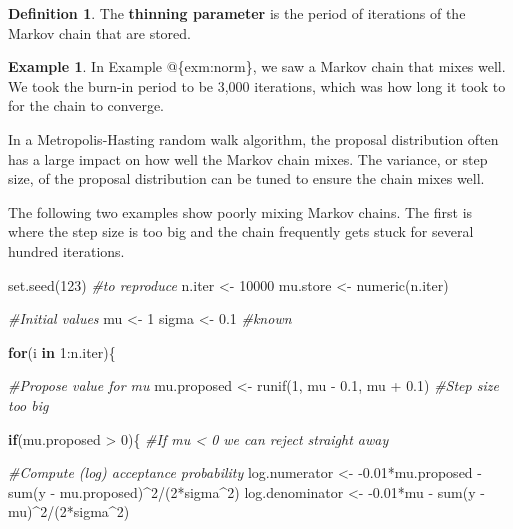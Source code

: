 \documentclass[
]{book}
\newenvironment{Shaded}{\begin{snugshade}}{\end{snugshade}}
\newcommand{\CommentTok}[1]{\textcolor[rgb]{0.56,0.35,0.01}{\textit{#1}}}
\newcommand{\ControlFlowTok}[1]{\textcolor[rgb]{0.13,0.29,0.53}{\textbf{#1}}}
\newcommand{\DecValTok}[1]{\textcolor[rgb]{0.00,0.00,0.81}{#1}}
\newcommand{\FloatTok}[1]{\textcolor[rgb]{0.00,0.00,0.81}{#1}}
\newcommand{\FunctionTok}[1]{\textcolor[rgb]{0.00,0.00,0.00}{#1}}
\newcommand{\NormalTok}[1]{#1}
\newcommand{\OtherTok}[1]{\textcolor[rgb]{0.56,0.35,0.01}{#1}}
\newcommand{\SpecialCharTok}[1]{\textcolor[rgb]{0.00,0.00,0.00}{#1}}
\theoremstyle{definition}
\newtheorem{definition}{Definition}[chapter]
\theoremstyle{definition}
\newtheorem{example}{Example}[chapter]
\theoremstyle{definition}
\theoremstyle{definition}
\theoremstyle{remark}
\begin{document}
\begin{definition}
The \textbf{thinning parameter} is the period of iterations of the Markov chain that are stored.
\end{definition}

\begin{example}
In Example @\{exm:norm\}, we saw a Markov chain that mixes well. We took the burn-in period to be 3,000 iterations, which was how long it took to for the chain to converge.

In a Metropolis-Hasting random walk algorithm, the proposal distribution often has a large impact on how well the Markov chain mixes. The variance, or step size, of the proposal distribution can be tuned to ensure the chain mixes well.

The following two examples show poorly mixing Markov chains. The first is where the step size is too big and the chain frequently gets stuck for several hundred iterations.

\begin{Shaded}
\begin{Highlighting}[]
\FunctionTok{set.seed}\NormalTok{(}\DecValTok{123}\NormalTok{) }\CommentTok{\#to reproduce}
\NormalTok{n.iter   }\OtherTok{\textless{}{-}} \DecValTok{10000}
\NormalTok{mu.store }\OtherTok{\textless{}{-}} \FunctionTok{numeric}\NormalTok{(n.iter)}

\CommentTok{\#Initial values}
\NormalTok{mu }\OtherTok{\textless{}{-}} \DecValTok{1} 
\NormalTok{sigma }\OtherTok{\textless{}{-}} \FloatTok{0.1} \CommentTok{\#known}

\ControlFlowTok{for}\NormalTok{(i }\ControlFlowTok{in} \DecValTok{1}\SpecialCharTok{:}\NormalTok{n.iter)\{}
  
  \CommentTok{\#Propose value for mu}
\NormalTok{  mu.proposed }\OtherTok{\textless{}{-}} \FunctionTok{runif}\NormalTok{(}\DecValTok{1}\NormalTok{, mu }\SpecialCharTok{{-}} \FloatTok{0.1}\NormalTok{, mu }\SpecialCharTok{+} \FloatTok{0.1}\NormalTok{) }\CommentTok{\#Step size too big}
  
  \ControlFlowTok{if}\NormalTok{(mu.proposed }\SpecialCharTok{\textgreater{}} \DecValTok{0}\NormalTok{)\{ }\CommentTok{\#If mu \textless{} 0 we can reject straight away}
    
    \CommentTok{\#Compute (log) acceptance probability}
\NormalTok{    log.numerator   }\OtherTok{\textless{}{-}} \SpecialCharTok{{-}}\FloatTok{0.01}\SpecialCharTok{*}\NormalTok{mu.proposed }\SpecialCharTok{{-}} \FunctionTok{sum}\NormalTok{(y }\SpecialCharTok{{-}}\NormalTok{ mu.proposed)}\SpecialCharTok{\^{}}\DecValTok{2}\SpecialCharTok{/}\NormalTok{(}\DecValTok{2}\SpecialCharTok{*}\NormalTok{sigma}\SpecialCharTok{\^{}}\DecValTok{2}\NormalTok{)}
\NormalTok{    log.denominator }\OtherTok{\textless{}{-}} \SpecialCharTok{{-}}\FloatTok{0.01}\SpecialCharTok{*}\NormalTok{mu }\SpecialCharTok{{-}} \FunctionTok{sum}\NormalTok{(y }\SpecialCharTok{{-}}\NormalTok{ mu)}\SpecialCharTok{\^{}}\DecValTok{2}\SpecialCharTok{/}\NormalTok{(}\DecValTok{2}\SpecialCharTok{*}\NormalTok{sigma}\SpecialCharTok{\^{}}\DecValTok{2}\NormalTok{)}
    

\end{Highlighting}
\end{Shaded}
\end{example}
\end{document}
